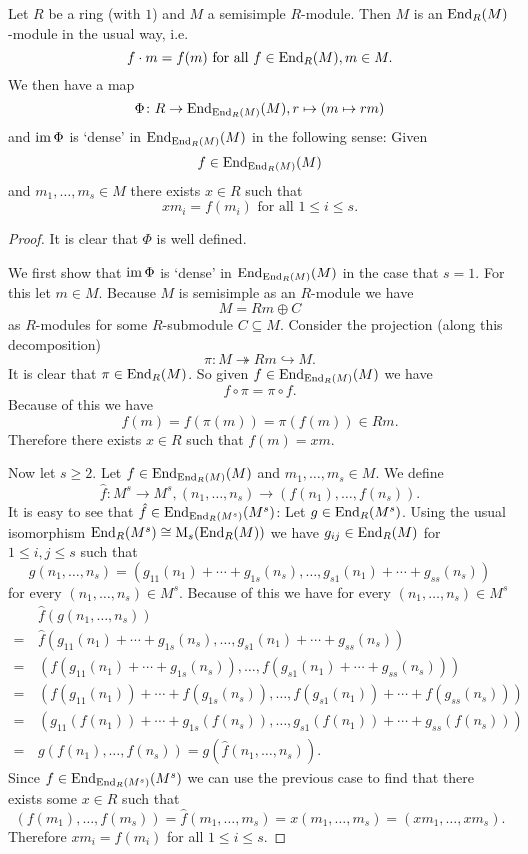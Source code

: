 \begin{thrm}
 Let $R$ be a ring (with $1$) and $M$ a semisimple $R$-module. Then $M$ is an $\operatorname{End}_R(M)$-module in the usual way, i.e.\
 \[
  f \cdot m = f(m) \text{ for all } f \in \operatorname{End}_R(M), m \in M.
 \]
 We then have a map
 \[
  \Phi \colon R \to \operatorname{End}_{\operatorname{End}_R(M)}(M), r \mapsto (m \mapsto rm)
 \]
 and $\operatorname{im} \Phi$ is `dense' in $\operatorname{End}_{\operatorname{End}_R(M)}(M)$ in the following sense: Given
 \[
  f \in \operatorname{End}_{\operatorname{End}_R(M)}(M)
 \]
 and $m_1, \dotsc, m_s \in M$ there exists $x \in R$ such that
 \[
  x m_i = f(m_i) \text{ for all } 1 \leq i \leq s.
 \]
\end{thrm}
\begin{proof}
 It is clear that $\Phi$ is well defined.
 
 We first show that $\operatorname{im} \Phi$ is `dense' in $\operatorname{End}_{\operatorname{End}_R(M)}(M)$ in the case that $s = 1$. For this let $m \in M$. Because $M$ is semisimple as an $R$-module we have
 \[
  M = Rm \oplus C
 \]
 as $R$-modules for some $R$-submodule $C \subseteq M$. Consider the projection (along this decomposition)
 \[
  \pi \colon M \twoheadrightarrow Rm \hookrightarrow M.
 \]
 It is clear that $\pi \in \operatorname{End}_R(M)$. So given $f \in \operatorname{End}_{\operatorname{End}_R(M)}(M)$ we have
 \[
  f \circ \pi = \pi \circ f.
 \]
 Because of this we have
 \[
  f(m) = f(\pi(m)) = \pi(f(m)) \in Rm.
 \]
 Therefore there exists $x \in R$ such that $f(m) = xm$.

 Now let $s \geq 2$. Let $f \in \operatorname{End}_{\operatorname{End}_R(M)}(M)$ and $m_1, \dotsc, m_s \in M$. We define
 \[
  \hat{f} \colon M^s \to M^s, (n_1, \dotsc, n_s) \to (f(n_1), \dotsc, f(n_s)).
 \]
 It is easy to see that $\hat{f} \in \operatorname{End}_{\operatorname{End}_R(M^s)}(M^s)$: Let $g \in \operatorname{End}_R(M^s)$. Using the usual isomorphism $\operatorname{End}_R(M^s) \cong \operatorname{M}_s(\operatorname{End}_R(M))$ we have $g_{ij} \in \operatorname{End}_R(M)$ for $1 \leq i,j \leq s$ such that
 \[
  g(n_1, \dotsc, n_s) = (g_{11}(n_1) + \dotsb + g_{1s}(n_s), \dotsc, g_{s1}(n_1) + \dotsb + g_{ss}(n_s))
 \]
 for every $(n_1, \dotsc, n_s) \in M^s$. Because of this we have for every $(n_1, \dotsc, n_s) \in M^s$
 \begin{align*}
   &\, \hat{f}(g(n_1, \dotsc, n_s)) \\
  =&\, \hat{f}(g_{11}(n_1) + \dotsb + g_{1s}(n_s), \dotsc, g_{s1}(n_1) + \dotsb + g_{ss}(n_s)) \\
  =&\, (f(g_{11}(n_1) + \dotsb + g_{1s}(n_s)), \dotsc, f(g_{s1}(n_1) + \dotsb + g_{ss}(n_s))) \\
  =&\, (f(g_{11}(n_1)) + \dotsb + f(g_{1s}(n_s)), \dotsc, f(g_{s1}(n_1)) + \dotsb + f(g_{ss}(n_s))) \\
  =&\, (g_{11}(f(n_1)) + \dotsb + g_{1s}(f(n_s)), \dotsc, g_{s1}(f(n_1)) + \dotsb + g_{ss}(f(n_s))) \\
  =&\, g(f(n_1), \dotsc, f(n_s))
  =    g(\hat{f}(n_1, \dotsc, n_s)).
 \end{align*}
 Since $f \in \operatorname{End}_{\operatorname{End}_R(M^s)}(M^s)$ we can use the previous case to find that there exists some $x \in R$ such that
 \[
  (f(m_1), \dotsc, f(m_s))
  = \hat{f}(m_1, \dotsc, m_s)
  = x (m_1, \dotsc, m_s)
  = (x m_1, \dotsc, x m_s).
 \]
 Therefore $x m_i = f(m_i)$ for all $1 \leq i \leq s$.
\end{proof}


